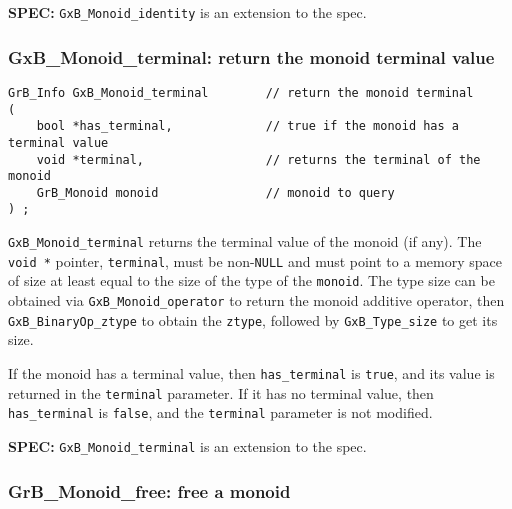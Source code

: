 \documentclass[12pt]{article}
\begin{document}
\begin{spec}
{\bf SPEC:} \verb'GxB_Monoid_identity' is an extension to the spec.
\end{spec}

\subsubsection{{\sf GxB\_Monoid\_terminal:} return the monoid terminal value}

\begin{mdframed}[userdefinedwidth=6in]
{\footnotesize
\begin{verbatim}
GrB_Info GxB_Monoid_terminal        // return the monoid terminal
(
    bool *has_terminal,             // true if the monoid has a terminal value
    void *terminal,                 // returns the terminal of the monoid
    GrB_Monoid monoid               // monoid to query
) ;
\end{verbatim}
} \end{mdframed}

\verb'GxB_Monoid_terminal' returns the terminal value of the monoid (if any).
The \verb'void *' pointer, \verb'terminal', must be non-\verb'NULL' and must
point to a memory space of size at least equal to the size of the type of the
\verb'monoid'.  The type size can be obtained via \verb'GxB_Monoid_operator' to
return the monoid additive operator, then \verb'GxB_BinaryOp_ztype' to obtain
the \verb'ztype', followed by \verb'GxB_Type_size' to get its size.

If the monoid has a terminal value, then \verb'has_terminal' is \verb'true',
and its value is returned in the \verb'terminal' parameter.  If it has no
terminal value, then \verb'has_terminal' is \verb'false', and the
\verb'terminal' parameter is not modified.

\begin{spec}
{\bf SPEC:} \verb'GxB_Monoid_terminal' is an extension to the spec.
\end{spec}

\subsubsection{{\sf GrB\_Monoid\_free:} free a monoid}
\label{monoid_free}
\end{document}
